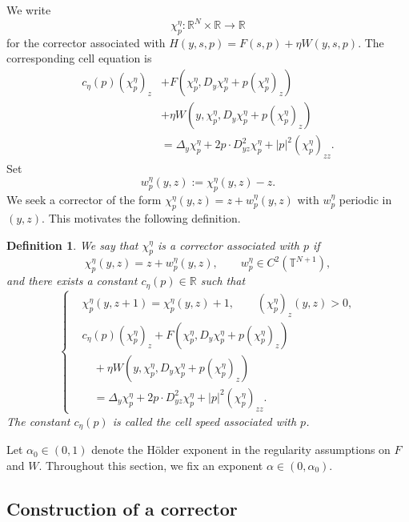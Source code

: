 \documentclass[preprint]{elsarticle}
\newtheorem{definition}{Definition}[section]
\numberwithin{equation}{section}
\begin{document}
We write
$$
\chi_p^\eta:\mathbb R^N\times\mathbb R\to\mathbb R
$$
for the corrector associated with
$
H(y,s,p)=F(s,p)+\eta W(y,s,p).
$
The corresponding cell equation is
\begin{equation}
\begin{aligned}
c_\eta(p)(\chi_p^\eta)_z
&+
F\left(\chi_p^\eta,D_y\chi_p^\eta+p(\chi_p^\eta)_z\right)
\\
&+
\eta W\left(y,\chi_p^\eta,D_y\chi_p^\eta+p(\chi_p^\eta)_z\right)
\\
&=
\Delta_y\chi_p^\eta
+
2p\cdot D^2_{yz}\chi_p^\eta
+
|p|^2(\chi_p^\eta)_{zz}.
\end{aligned}\label{Cell}
\end{equation}
Set
$$
w_p^\eta(y,z):=\chi_p^\eta(y,z)-z.
$$
We seek a corrector of the form $\chi_p^\eta(y,z)=z+w_p^\eta(y,z)$ with $w_p^\eta$ periodic in $(y,z)$. This motivates the following definition.
\begin{definition}
We say that $\chi_p^\eta$ is a corrector associated with $p$ if
\[
\chi_p^\eta(y,z)=z+w_p^\eta(y,z),
\qquad
w_p^\eta\in C^2(\mathbb T^{N+1}),
\]
and there exists a constant $c_\eta(p)\in\mathbb R$ such that
\begin{equation}
\left\{
\begin{aligned}
&\chi_p^\eta(y,z+1)=\chi_p^\eta(y,z)+1,\qquad
(\chi_p^\eta)_z(y,z)>0,
\\[2mm]
&c_\eta(p)(\chi_p^\eta)_z
+
F\left(\chi_p^\eta,D_y\chi_p^\eta+p(\chi_p^\eta)_z\right)
\\
&\quad
+
\eta W\left(y,\chi_p^\eta,D_y\chi_p^\eta+p(\chi_p^\eta)_z\right)
\\
&\quad
=
\Delta_y\chi_p^\eta
+
2p\cdot D^2_{yz}\chi_p^\eta
+
|p|^2(\chi_p^\eta)_{zz}.
\end{aligned}
\right.
\end{equation}
The constant $c_\eta(p)$ is called the cell speed associated with $p$.
\end{definition}
Let $\alpha_0\in(0,1)$ denote the Hölder exponent in the regularity assumptions on $F$ and $W$. Throughout this section, we fix an exponent $\alpha\in(0,\alpha_0)$.
\subsection{Construction of a corrector}
\end{document}
